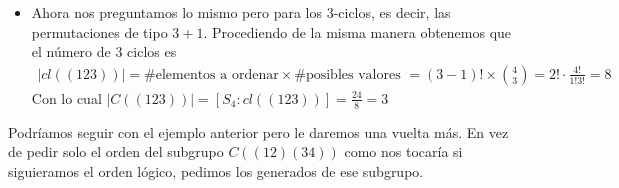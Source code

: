 \begin{ej}
\begin{itemize}
\begin{itemize}
		\end{itemize}
		\item Ahora nos preguntamos lo mismo pero para los 3-ciclos, es decir, las permutaciones de tipo $3+1$. Procediendo de la misma manera obtenemos que el número de 3 ciclos es
		\begin{align*}
			|cl((123))| = \text{\# elementos a ordenar} \times \text{\# posibles valores } = (3-1)! \times \binom{4}{3} = 2! \cdot \frac{4!}{1!3!} = 8
		\end{align*}
		Con lo cual $|C((123))| = [S_4:cl((123))] = \frac{24}{8} = 3$
	\end{itemize}
\end{ej}

Podríamos seguir con el ejemplo anterior pero le daremos una vuelta más. En vez de pedir solo el orden del subgrupo $C((12)(34))$ como nos tocaría si siguieramos el orden lógico, pedimos los generados de ese subgrupo.

